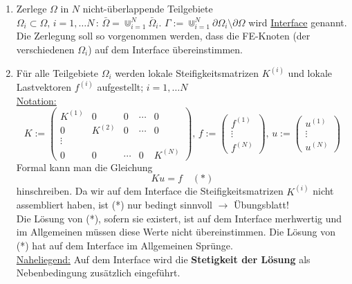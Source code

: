 \begin{enumerate}
\item
Zerlege $\Omega$ in $N$ nicht-überlappende Teilgebiete $\Omega_i \subset \Omega,\, i=1,\dots N \, : \, \bar \Omega = \Cup_{i=1}^N \bar \Omega_i $. $ \Gamma := \Cup_{i=1}^N \partial \Omega_i \setminus \partial \Omega$ wird \underline{Interface} genannt.\\
Die Zerlegung soll so vorgenommen werden, dass die FE-Knoten (der verschiedenen $\Omega_i$) auf dem Interface übereinstimmen.
\item
Für alle Teilgebiete $\Omega_i$ werden lokale Steifigkeitsmatrizen $K^{(i)}$ und lokale Lastvektoren $f^{(i)}$ aufgestellt; $i=1,\dots N$\\
\underline{Notation:}
\[ K:= \begin{pmatrix}  K^{(1)} & 0 & 0 & \cdots & 0 \\
				0 & K^{(2)}   & 0 & \cdots  &0 \\
				\vdots\\
				 0 & 0 & \cdots & 0 & K^{(N)}
	\end{pmatrix}, \,
  f:= \begin{pmatrix} f^{(1)} \\ \vdots \\ f^{(N)} \end{pmatrix}, \, u:=  \begin{pmatrix} u^{(1)} \\ \vdots \\ u^{(N)} \end{pmatrix}
\]
Formal kann man die Gleichung 
\begin{equation}
Ku=f \quad (*)
\end{equation}
hinschreiben. Da wir auf dem Interface die Steifigkeitsmatrizen $K^{(i)}$ nicht assembliert haben, ist (*) nur bedingt sinnvoll $\rightarrow$ Übungsblatt!\\
Die Lösung von (*), sofern sie existert, ist auf dem Interface merhwertig und im Allgemeinen müssen diese Werte nicht übereinstimmen. Die Lösung von (*) hat auf dem Interface im Allgemeinen Sprünge.\\
\underline{Naheliegend:} Auf dem Interface wird die \textbf{Stetigkeit der Lösung} als Nebenbedingung zusätzlich eingeführt.







\end{enumerate}
